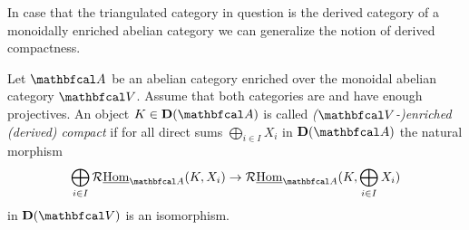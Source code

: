 %	


In case that the triangulated category in question is the derived category of a monoidally enriched abelian category we can generalize the notion of derived compactness.
\begin{definition}
	\label{definition: enriched compactness}
	
	Let $\category{A}$ be an abelian category enriched over the monoidal abelian category $\category{V}$. Assume that both categories are  and have enough projectives. An object $K \in \derived{\category{A}}$ is called \emph{($\category{V}$-)enriched (derived) compact} if for all direct sums $\bigoplus_{i\in I} X_i$ in $\derived{\category{A}}$ the natural morphism
		$$\bigoplus_{i\in I} \eRHom_\category{A}(K, X_i) \to \eRHom_\category{A}(K, \bigoplus_{i\in I} X_i)$$
	in $\derived{\category{V}}$ is an isomorphism.
\end{definition}


